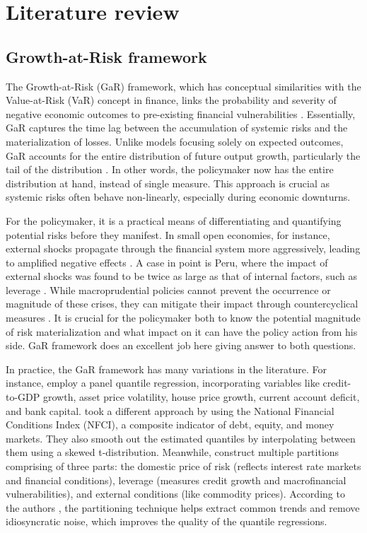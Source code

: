 \documentclass[12pt,a4paper]{article}
\begin{document}
\section{Literature review}


\subsection{Growth-at-Risk framework}
The Growth-at-Risk (GaR) framework, which has conceptual similarities with the Value-at-Risk (VaR) concept in finance, links the probability and severity of negative economic outcomes to pre-existing financial vulnerabilities \citep{imf_gar_2019}. Essentially, GaR captures the time lag between the accumulation of systemic risks and the materialization of losses. Unlike models focusing solely on expected outcomes, GaR accounts for the entire distribution of future output growth, particularly the tail of the distribution \citep{szabo2020}. In other words, the policymaker now has the entire distribution at hand, instead of single measure. This approach is crucial as systemic risks often behave non-linearly, especially during economic downturns.

For the policymaker, it is a practical means of differentiating and quantifying potential risks before they manifest. In small open economies, for instance, external shocks propagate through the financial system more aggressively, leading to amplified negative effects \citep{esrb2021}. A case in point is Peru, where the impact of external shocks was found to be twice as large as that of internal factors, such as leverage \citep{imf_gar_2019}. While macroprudential policies cannot prevent the occurrence or magnitude of these crises, they can mitigate their impact through countercyclical measures \citep{esrb2021}. It is crucial for the policymaker both to know the potential magnitude of risk materialization and what impact on it can have the policy action from his side. GaR framework does an excellent job here giving answer to both questions.

In practice, the GaR framework has many variations in the literature. For instance, \citet{aikman2019} employ a panel quantile regression, incorporating variables like credit-to-GDP growth, asset price volatility, house price growth, current account deficit, and bank capital. \citet{adrian_2019} took a different approach by using the National Financial Conditions Index (NFCI), a composite indicator of debt, equity, and money markets. They also smooth out the estimated quantiles by interpolating between them using a skewed t-distribution. Meanwhile, \citet{imf_gar_2019} construct multiple partitions comprising of three parts: the domestic price of risk (reflects interest rate markets and financial conditions), leverage (measures credit growth and macrofinancial vulnerabilities), and external conditions (like commodity prices). According to the authors \citep{imf_gar_2019}, the partitioning technique helps extract common trends and remove idiosyncratic noise, which improves the quality of the quantile regressions.
\end{document}
